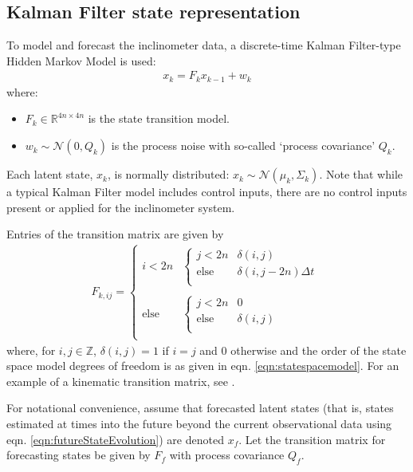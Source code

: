 \documentclass[pamm,a4paper,fleqn]{w-art}
\begin{document}
\subsection{Kalman Filter state representation}

To model and forecast the inclinometer data, a discrete-time Kalman Filter-type Hidden Markov Model \cite{russell2010artificial} is used:
\begin{align}
  \label{eqn:futureStateEvolution}
  x_k = F_k x_{k-1} + w_k
\end{align}
where:
\begin{itemize}
  \item $F_k \in \mathbb{R}^{4n \times 4n}$ is the state transition model.
  \item $w_k \sim \mathcal{N}(0, Q_k)$ is the process noise with so-called `process covariance' $Q_k$.
\end{itemize}
Each latent state, $x_k$, is normally distributed: $x_k \sim \mathcal{N}\left(\mu_k, \Sigma_k\right)$. Note that while a typical Kalman Filter model includes control inputs, there are no control inputs present or applied for the inclinometer system. 

Entries of the transition matrix are given by
\begin{align}
  F_{k,ij} =      
  \begin{cases}
    i < 2n & \begin{cases} j < 2n & \delta(i,j) \\ \text{else} & \delta(i,j-2n) \Delta t \\ \end{cases} \\\\
    \text{else} & \begin{cases} j < 2n & 0 \\ \text{else} & \delta(i,j) \\ \end{cases} \\
  \end{cases}
\end{align}
where, for $i, j \in \mathbb{Z}$, $\delta(i,j) = 1$ if $i = j$ and $0$ otherwise and the order of the state space model degrees of freedom is as given in eqn. \ref{eqn:statespacemodel}. For an example of a kinematic transition matrix, see \cite{chen2021time}.

For notational convenience, assume that forecasted latent states (that is, states estimated at times into the future beyond the current observational data using eqn. \ref{eqn:futureStateEvolution}) are denoted $x_f$. Let the transition matrix for forecasting states be given by $F_f$ with process covariance $Q_f$.
\end{document}
